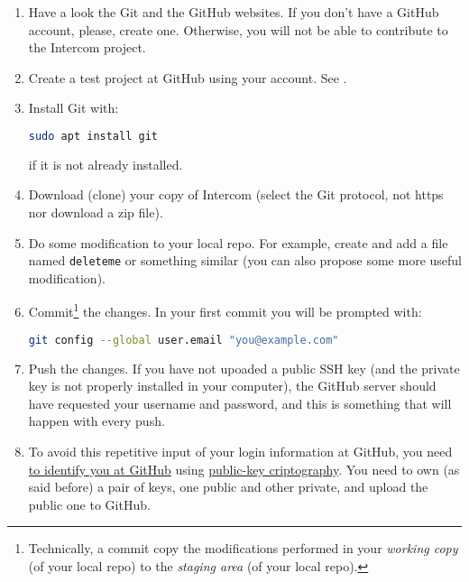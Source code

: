 \begin{enumerate}
  
\item Have a look the Git \cite{Git, Git-book} and the GitHub
  \cite{GitHub} websites. If you don't have a GitHub account, please,
  create one. Otherwise, you will not be able to contribute to the
  Intercom project.

\item Create a test project at GitHub using your account. See
  \cite{GitHub-HW}.

\item Install Git with:
  \begin{lstlisting}[language=bash]
    sudo apt install git
  \end{lstlisting}
  if it is not already installed.
    
\item Download (clone) your copy of Intercom (select the Git protocol,
  not https nor download a zip file).

\item Do some modification to your local repo. For example, create and
  add a file named \texttt{deleteme} or something similar (you can
  also propose some more useful modification).
  
\item Commit\footnote{Technically, a commit copy the modifications
performed in your \emph{working copy} (of your local repo) to the
\emph{staging area} (of your local repo).} the changes. In your first
  commit you will be prompted with:

  \begin{lstlisting}[language=bash]
    git config --global user.email "you@example.com"
  \end{lstlisting}

\item Push the changes. If you have not upoaded a public
  SSH key (and the private key is not properly installed in your
  computer), the GitHub server should have requested your username and
  password, and this is something that will happen with every push.
  
\item To avoid this repetitive input of your login information at
  GitHub, you need
  \href{https://docs.github.com/en/github/authenticating-to-github/connecting-to-github-with-ssh}{to
    identify you at GitHub} using
  \href{https://en.wikipedia.org/wiki/Public-key_cryptography}{public-key
    criptography}. You need to own (as said before) a pair of keys,
  one public and other private, and upload the public one to GitHub.
  

\end{enumerate}
